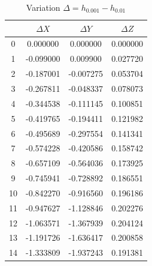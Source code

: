 \documentclass[12pt, a4paper]{article}
\begin{document}
	\begin{table}[H]
		\centering
		\footnotesize
		\begin{tabular}{|c|c|c|c|}
			\toprule
			   & $\Delta X$ & $\Delta Y$ & $\Delta Z$ \\
			\midrule
			0  & 0.000000   & 0.000000   & 0.000000   \\
			1  & -0.099000  & 0.009900   & 0.027720   \\
			2  & -0.187001  & -0.007275  & 0.053704   \\
			3  & -0.267811  & -0.048337  & 0.078073   \\
			4  & -0.344538  & -0.111145  & 0.100851   \\
			5  & -0.419765  & -0.194411  & 0.121982   \\
			6  & -0.495689  & -0.297554  & 0.141341   \\
			7  & -0.574228  & -0.420586  & 0.158742   \\
			8  & -0.657109  & -0.564036  & 0.173925   \\
			9  & -0.745941  & -0.728892  & 0.186551   \\
			10 & -0.842270  & -0.916560  & 0.196186   \\
			11 & -0.947627  & -1.128846  & 0.202276   \\
			12 & -1.063571  & -1.367939  & 0.204124   \\
			13 & -1.191726  & -1.636417  & 0.200858   \\
			14 & -1.333809  & -1.937243  & 0.191381   \\
			\bottomrule
		\end{tabular}
		\caption{Variation $\Delta = h_{0.001} - h_{0.01}$}
	\end{table}
	    
\end{document}
